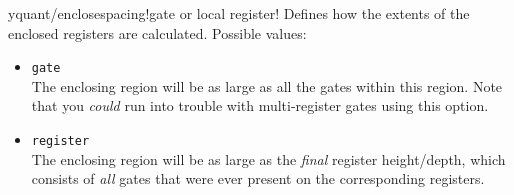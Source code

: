 \documentclass{scrartcl}
\makeatletter
\let\unpatched@minted@inline@iii=\minted@inline@iii%
\def\patched@minted@inline@iii#1{%
      \unpatched@minted@inline@iii{#1}%
      \par%
      \endgroup\egroup\nopagebreak\vskip-\parskip\nopagebreak%
      \noindent\ignorespaces%
   }
\def\patch@mintinline{%
      \let\minted@inline@iii=\patched@minted@inline@iii%
   }
\let\unpatched@RobustMintInlineProcess@ii=\RobustMintInlineProcess@ii
\def\patched@RobustMintInlineProcess@ii#1{%
      \unpatched@RobustMintInlineProcess@ii{#1}%
      \par%
      \endgroup\egroup\nopagebreak\vskip-\parskip\nopagebreak%
      \noindent\ignorespaces%
   }
\def\patch@mintinline{%
      \let\RobustMintInlineProcess@ii=\patched@RobustMintInlineProcess@ii%
   }
\newenvironment{option*}[3][]{\ifhmode\par\fi\addvspace{5mm}%
   \vbox\bgroup\begingroup%
      \patch@mintinline%
      \raggedleft%
      \hspace*{-1cm}%
      \phantomsection\label{yquant:/#2/#3}%
      \texttt{\ifstrempty{#1}\relax{\compat{#1}}\textcolor{gray}{/#2/}\textcolor{mintgreen}{#3}}\hfill default: %
      \tex}{\par\addvspace{5mm}}
\newenvironment{codeexample*}{%
   \VerbatimEnvironment%
   \let\FVB@VerbatimOut\minted@FVB@VerbatimOut
   \let\FVE@VerbatimOut\minted@FVE@VerbatimOut
   \minted@configlang{tex}%
   \minted@fvset
   \begin{VerbatimOut}[codes={\catcode`\^^I=12},firstline,lastline]{\minted@jobname.pyg}%
}{
   \end{VerbatimOut}%
   \minted@langlinenoson%
   \begin{adjustbox}{center}
       \minted@jobname.pyg %
   \end{adjustbox}\nopagebreak
   \expandafter\minted@pygmentize\expandafter{\minted@lang}%
   \minted@langlinenosoff%
   \par%
}
\makeatother
\begin{document}
            \begin{option*}{yquant/enclose}{spacing}!gate or local register!
               Defines how the extents of the enclosed registers are calculated.
               Possible values:
               \begin{itemize}
                  \item {}\texttt{gate} \\
                     The enclosing region will be as large as all the gates within this region.
                     Note that you \emph{could} run into trouble with multi\hyp register gates using this option.
                     \begin{example}
                        \begin{codeexample*}
                        \end{codeexample*}
                     \end{example}
                  \item {}\texttt{register} \\
                     The enclosing region will be as large as the \emph{final} register height/depth, which consists of \emph{all} gates that were ever present on the corresponding registers.
                     \begin{example}
                        \begin{codeexample*}
                        \end{codeexample*}
                     \end{example}

\end{itemize}
\end{option*}
\end{document}
